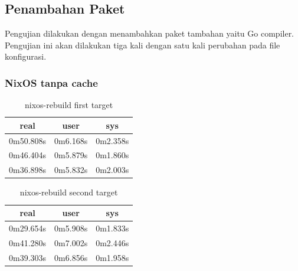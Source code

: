 \documentclass[10pt,]{report}
\begin{document}
\begin{adjustwidth}{20pt}{}
	\subsection{Penambahan Paket}
	\begin{adjustwidth}{20pt}{}
		Pengujian dilakukan dengan menambahkan paket tambahan yaitu Go compiler.
		Pengujian ini akan dilakukan tiga kali dengan satu kali perubahan pada file
		konfigurasi.
	\end{adjustwidth}
	\subsubsection{NixOS tanpa cache}
	\begin{table}[H]
		\caption{nixos-rebuild first target}
		\begin{center}
			\begin{tabular}[c]{|c|c|c|}
				\hline
				\multicolumn{1}{|c|}{\textbf{real}} &
				\multicolumn{1}{c|}{\textbf{user}}  &
				\multicolumn{1}{c|}{\textbf{sys}}                         \\
				\hline
				0m50.808s                           & 0m6.168s & 0m2.358s \\
				\hline
				0m46.404s                           & 0m5.879s & 0m1.860s \\
				\hline
				0m36.898s                           & 0m5.832s & 0m2.003s \\
				\hline
			\end{tabular}
		\end{center}
	\end{table}
	\vspace{-5mm}
	\begin{table}[H]
		\caption{nixos-rebuild second target}
		\begin{center}
			\begin{tabular}[c]{|c|c|c|}
				\hline
				\multicolumn{1}{|c|}{\textbf{real}} &
				\multicolumn{1}{c|}{\textbf{user}}  &
				\multicolumn{1}{c|}{\textbf{sys}}                         \\
				\hline
				0m29.654s                           & 0m5.908s & 0m1.833s \\
				\hline
				0m41.280s                           & 0m7.002s & 0m2.446s \\
				\hline
				0m39.303s                           & 0m6.856s & 0m1.958s \\
				\hline
			\end{tabular}
		\end{center}
	\end{table}

\end{adjustwidth}
\end{document}
